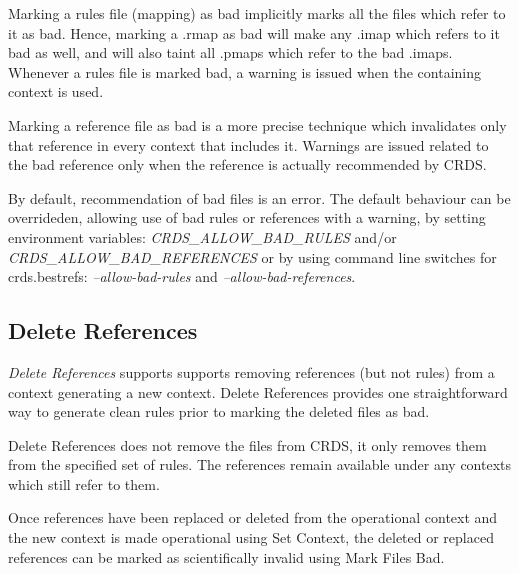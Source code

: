 \documentclass[letterpaper,10pt,english]{sphinxmanual}
\begin{document}
Marking a rules file (mapping) as bad implicitly marks all the files
which refer to it as bad.  Hence,  marking a .rmap as bad will make
any .imap which refers to it bad as well,  and will also taint all .pmaps
which refer to the bad .imaps.   Whenever a rules file is marked bad,
a warning is issued when the containing context is used.

Marking a reference file as bad is a more precise technique which invalidates
only that reference in every context that includes it.  Warnings are issued
related to the bad reference only when the reference is actually recommended by
CRDS.

By default, recommendation of bad files is an error.  The default
behaviour can be overrideden, allowing use of bad rules or references with a
warning, by setting environment variables: \emph{CRDS\_ALLOW\_BAD\_RULES} and/or
\emph{CRDS\_ALLOW\_BAD\_REFERENCES} or by using command line switches for
crds.bestrefs: \emph{--allow-bad-rules} and \emph{--allow-bad-references}.


\subsection{Delete References}
\label{web_site_use:delete-references}
\emph{Delete References} supports supports removing references (but not rules) from
a context generating a new context.  Delete References provides one
straightforward way to generate clean rules prior to marking the deleted files
as bad.
\begin{figure}[htbp]
\centering

\end{figure}

Delete References does not remove the files from CRDS, it only removes them
from the specified set of rules.  The references remain available under any
contexts which still refer to them.

Once references have been replaced or deleted from the operational context and
the new context is made operational using Set Context, the deleted or replaced
references can be marked as scientifically invalid using Mark Files Bad.
\end{document}
